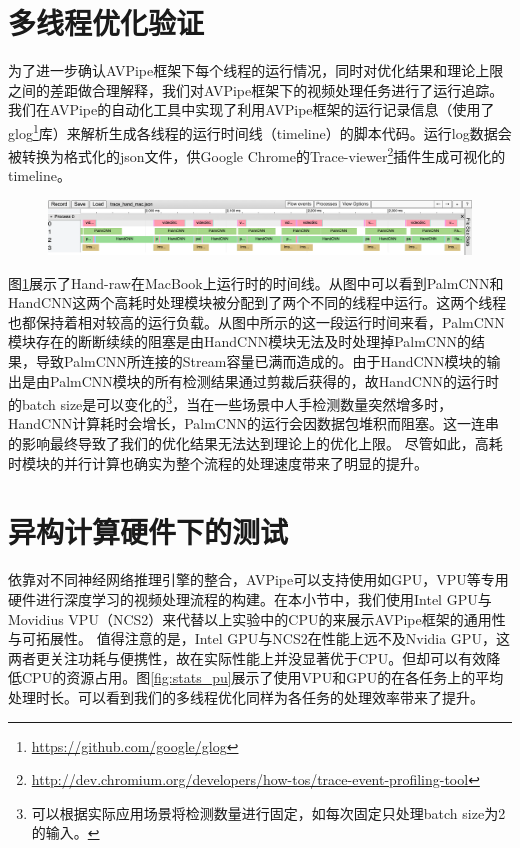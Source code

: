 \section{多线程优化验证}
为了进一步确认AVPipe框架下每个线程的运行情况，同时对优化结果和理论上限之间的差距做合理解释，我们对AVPipe框架下的视频处理任务进行了运行追踪。我们在AVPipe的自动化工具中实现了利用AVPipe框架的运行记录信息（使用了glog\footnote{\url{https://github.com/google/glog}}库）来解析生成各线程的运行时间线（timeline）的脚本代码。运行log数据会被转换为格式化的json文件，供Google Chrome的Trace-viewer\footnote{\url{http://dev.chromium.org/developers/how-tos/trace-event-profiling-tool}}插件生成可视化的timeline。\par
\begin{figure}[htp]
    \centering
    \includegraphics[width=\textwidth]{figure/trace.png}
    \label{fig:trace}
\end{figure}
图\ref{fig:trace}展示了Hand-raw在MacBook上运行时的时间线。从图中可以看到PalmCNN和HandCNN这两个高耗时处理模块被分配到了两个不同的线程中运行。这两个线程也都保持着相对较高的运行负载。从图中所示的这一段运行时间来看，PalmCNN模块存在的断断续续的阻塞是由HandCNN模块无法及时处理掉PalmCNN的结果，导致PalmCNN所连接的Stream容量已满而造成的。由于HandCNN模块的输出是由PalmCNN模块的所有检测结果通过剪裁后获得的，故HandCNN的运行时的batch size是可以变化的\footnote{可以根据实际应用场景将检测数量进行固定，如每次固定只处理batch size为2的输入。}，当在一些场景中人手检测数量突然增多时，HandCNN计算耗时会增长，PalmCNN的运行会因数据包堆积而阻塞。这一连串的影响最终导致了我们的优化结果无法达到理论上的优化上限。
尽管如此，高耗时模块的并行计算也确实为整个流程的处理速度带来了明显的提升。

\section{异构计算硬件下的测试}
依靠对不同神经网络推理引擎的整合，AVPipe可以支持使用如GPU，VPU等专用硬件进行深度学习的视频处理流程的构建。在本小节中，我们使用Intel GPU与Movidius VPU（NCS2）来代替以上实验中的CPU的来展示AVPipe框架的通用性与可拓展性。
值得注意的是，Intel GPU与NCS2在性能上远不及Nvidia GPU，这两者更关注功耗与便携性，故在实际性能上并没显著优于CPU。但却可以有效降低CPU的资源占用。图\ref{fig:stats_pu}展示了使用VPU和GPU的在各任务上的平均处理时长。可以看到我们的多线程优化同样为各任务的处理效率带来了提升。\par


